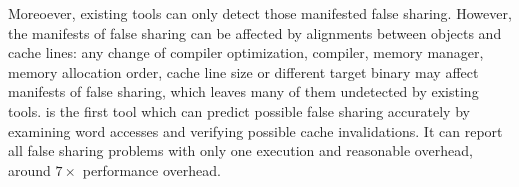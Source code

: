 Moreoever, existing tools can only detect those manifested false sharing.
However, the manifests of false sharing can be affected by alignments between
objects and cache lines: any change of compiler optimization, compiler, memory manager, 
memory allocation order, cache line size or different target binary 
may affect manifests of false sharing, 
which leaves many of them undetected by existing tools.
\Defaults{} is the first tool which can predict possible false sharing 
accurately by examining word accesses and verifying possible cache invalidations.   
It can report all false sharing problems with only one execution and reasonable overhead, around $7\times$ performance overhead.

